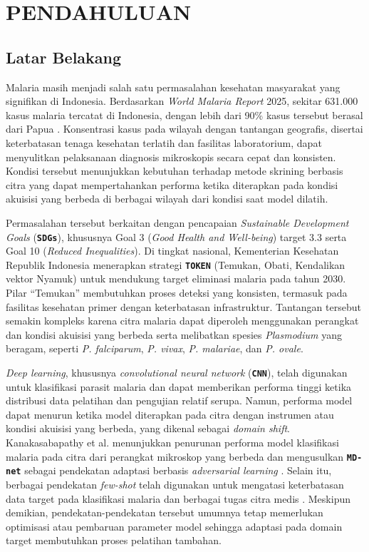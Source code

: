 \documentclass[conference]{IEEEtran}
\newcommand{\nama}[1]{\textbf{\texttt{#1}}}
\begin{document}
\section{PENDAHULUAN}

\subsection{Latar Belakang}

Malaria masih menjadi salah satu permasalahan kesehatan masyarakat yang signifikan di Indonesia. Berdasarkan \textit{World Malaria Report} 2025, sekitar 631.000 kasus malaria tercatat di Indonesia, dengan lebih dari 90\% kasus tersebut berasal dari Papua \cite{b1}. Konsentrasi kasus pada wilayah dengan tantangan geografis, disertai keterbatasan tenaga kesehatan terlatih dan fasilitas laboratorium, dapat menyulitkan pelaksanaan diagnosis mikroskopis secara cepat dan konsisten. Kondisi tersebut menunjukkan kebutuhan terhadap metode skrining berbasis citra yang dapat mempertahankan performa ketika diterapkan pada kondisi akuisisi yang berbeda di berbagai wilayah dari kondisi saat model dilatih.

Permasalahan tersebut berkaitan dengan pencapaian \textit{Sustainable Development Goals} (\nama{SDGs}), khususnya Goal 3 (\textit{Good Health and Well-being}) target 3.3 serta Goal 10 (\textit{Reduced Inequalities}). Di tingkat nasional, Kementerian Kesehatan Republik Indonesia menerapkan strategi \nama{TOKEN} (Temukan, Obati, Kendalikan vektor Nyamuk) untuk mendukung target eliminasi malaria pada tahun 2030. Pilar ``Temukan'' membutuhkan proses deteksi yang konsisten, termasuk pada fasilitas kesehatan primer dengan keterbatasan infrastruktur. Tantangan tersebut semakin kompleks karena citra malaria dapat diperoleh menggunakan perangkat dan kondisi akuisisi yang berbeda serta melibatkan spesies \textit{Plasmodium} yang beragam, seperti \textit{P. falciparum}, \textit{P. vivax}, \textit{P. malariae}, dan \textit{P. ovale}.

\textit{Deep learning}, khususnya \textit{convolutional neural network} (\nama{CNN}), telah digunakan untuk klasifikasi parasit malaria dan dapat memberikan performa tinggi ketika distribusi data pelatihan dan pengujian relatif serupa. Namun, performa model dapat menurun ketika model diterapkan pada citra dengan instrumen atau kondisi akuisisi yang berbeda, yang dikenal sebagai \textit{domain shift}. Kanakasabapathy et al. menunjukkan penurunan performa model klasifikasi malaria pada citra dari perangkat mikroskop yang berbeda dan mengusulkan \nama{MD-net} sebagai pendekatan adaptasi berbasis \textit{adversarial learning} \cite{b2}. Selain itu, berbagai pendekatan \textit{few-shot} telah digunakan untuk mengatasi keterbatasan data target pada klasifikasi malaria dan berbagai tugas citra medis \cite{b3, b4, b5, b6, b7, b8, b9}. Meskipun demikian, pendekatan-pendekatan tersebut umumnya tetap memerlukan optimisasi atau pembaruan parameter model sehingga adaptasi pada domain target membutuhkan proses pelatihan tambahan.
\end{document}
